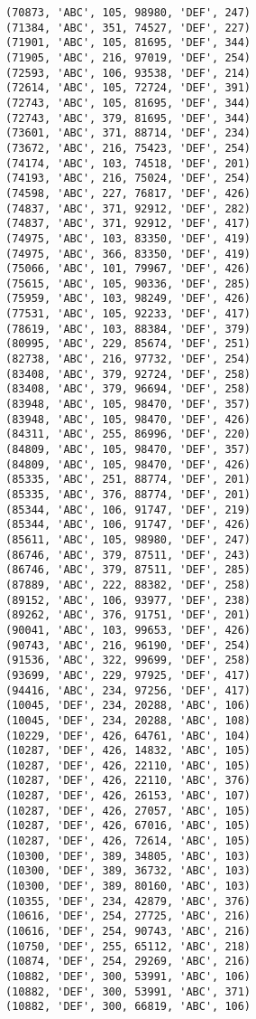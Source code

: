 \begin{verbatim}
(70873, 'ABC', 105, 98980, 'DEF', 247)
(71384, 'ABC', 351, 74527, 'DEF', 227)
(71901, 'ABC', 105, 81695, 'DEF', 344)
(71905, 'ABC', 216, 97019, 'DEF', 254)
(72593, 'ABC', 106, 93538, 'DEF', 214)
(72614, 'ABC', 105, 72724, 'DEF', 391)
(72743, 'ABC', 105, 81695, 'DEF', 344)
(72743, 'ABC', 379, 81695, 'DEF', 344)
(73601, 'ABC', 371, 88714, 'DEF', 234)
(73672, 'ABC', 216, 75423, 'DEF', 254)
(74174, 'ABC', 103, 74518, 'DEF', 201)
(74193, 'ABC', 216, 75024, 'DEF', 254)
(74598, 'ABC', 227, 76817, 'DEF', 426)
(74837, 'ABC', 371, 92912, 'DEF', 282)
(74837, 'ABC', 371, 92912, 'DEF', 417)
(74975, 'ABC', 103, 83350, 'DEF', 419)
(74975, 'ABC', 366, 83350, 'DEF', 419)
(75066, 'ABC', 101, 79967, 'DEF', 426)
(75615, 'ABC', 105, 90336, 'DEF', 285)
(75959, 'ABC', 103, 98249, 'DEF', 426)
(77531, 'ABC', 105, 92233, 'DEF', 417)
(78619, 'ABC', 103, 88384, 'DEF', 379)
(80995, 'ABC', 229, 85674, 'DEF', 251)
(82738, 'ABC', 216, 97732, 'DEF', 254)
(83408, 'ABC', 379, 92724, 'DEF', 258)
(83408, 'ABC', 379, 96694, 'DEF', 258)
(83948, 'ABC', 105, 98470, 'DEF', 357)
(83948, 'ABC', 105, 98470, 'DEF', 426)
(84311, 'ABC', 255, 86996, 'DEF', 220)
(84809, 'ABC', 105, 98470, 'DEF', 357)
(84809, 'ABC', 105, 98470, 'DEF', 426)
(85335, 'ABC', 251, 88774, 'DEF', 201)
(85335, 'ABC', 376, 88774, 'DEF', 201)
(85344, 'ABC', 106, 91747, 'DEF', 219)
(85344, 'ABC', 106, 91747, 'DEF', 426)
(85611, 'ABC', 105, 98980, 'DEF', 247)
(86746, 'ABC', 379, 87511, 'DEF', 243)
(86746, 'ABC', 379, 87511, 'DEF', 285)
(87889, 'ABC', 222, 88382, 'DEF', 258)
(89152, 'ABC', 106, 93977, 'DEF', 238)
(89262, 'ABC', 376, 91751, 'DEF', 201)
(90041, 'ABC', 103, 99653, 'DEF', 426)
(90743, 'ABC', 216, 96190, 'DEF', 254)
(91536, 'ABC', 322, 99699, 'DEF', 258)
(93699, 'ABC', 229, 97925, 'DEF', 417)
(94416, 'ABC', 234, 97256, 'DEF', 417)
(10045, 'DEF', 234, 20288, 'ABC', 106)
(10045, 'DEF', 234, 20288, 'ABC', 108)
(10229, 'DEF', 426, 64761, 'ABC', 104)
(10287, 'DEF', 426, 14832, 'ABC', 105)
(10287, 'DEF', 426, 22110, 'ABC', 105)
(10287, 'DEF', 426, 22110, 'ABC', 376)
(10287, 'DEF', 426, 26153, 'ABC', 107)
(10287, 'DEF', 426, 27057, 'ABC', 105)
(10287, 'DEF', 426, 67016, 'ABC', 105)
(10287, 'DEF', 426, 72614, 'ABC', 105)
(10300, 'DEF', 389, 34805, 'ABC', 103)
(10300, 'DEF', 389, 36732, 'ABC', 103)
(10300, 'DEF', 389, 80160, 'ABC', 103)
(10355, 'DEF', 234, 42879, 'ABC', 376)
(10616, 'DEF', 254, 27725, 'ABC', 216)
(10616, 'DEF', 254, 90743, 'ABC', 216)
(10750, 'DEF', 255, 65112, 'ABC', 218)
(10874, 'DEF', 254, 29269, 'ABC', 216)
(10882, 'DEF', 300, 53991, 'ABC', 106)
(10882, 'DEF', 300, 53991, 'ABC', 371)
(10882, 'DEF', 300, 66819, 'ABC', 106)

\end{verbatim}
